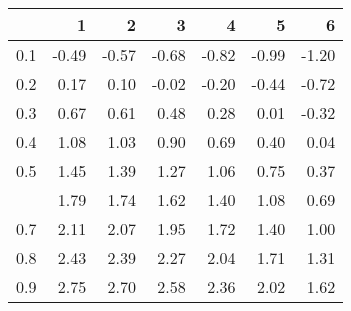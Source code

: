 
\begin{tabular}{lrrrrrr}
\toprule
  & 1 & 2 & 3 & 4 & 5 & 6\\
\midrule
0.1 & -0.49 & -0.57 & -0.68 & -0.82 & -0.99 & -1.20\\
0.2 & 0.17 & 0.10 & -0.02 & -0.20 & -0.44 & -0.72\\
0.3 & 0.67 & 0.61 & 0.48 & 0.28 & 0.01 & -0.32\\
0.4 & 1.08 & 1.03 & 0.90 & 0.69 & 0.40 & 0.04\\
0.5 & 1.45 & 1.39 & 1.27 & 1.06 & 0.75 & 0.37\\
\addlinespace
0.6 & 1.79 & 1.74 & 1.62 & 1.40 & 1.08 & 0.69\\
0.7 & 2.11 & 2.07 & 1.95 & 1.72 & 1.40 & 1.00\\
0.8 & 2.43 & 2.39 & 2.27 & 2.04 & 1.71 & 1.31\\
0.9 & 2.75 & 2.70 & 2.58 & 2.36 & 2.02 & 1.62\\
\bottomrule
\end{tabular}
